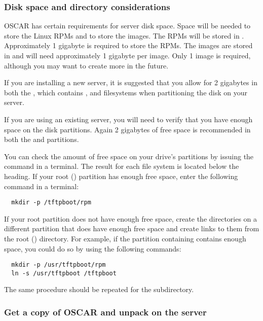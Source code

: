 \subsubsection{Disk space and directory considerations}
\label{det:serverdiskpar}

OSCAR has certain requirements for server disk space. Space will be
needed to store the Linux RPMs and to store the images.  The RPMs will
be stored in . Approximately 1 gigabyte is
required to store the RPMs.  The images are stored in
 and will need approximately 1 gigabyte
per image. Only 1 image is required, although you may want to create
more in the future.

If you are installing a new server, it is suggested that you allow for 
2 gigabytes in both the \file{/}, which contains ,  
and  filesystems when partitioning the disk on your server.

If you are using an existing server, you will need to verify that you have 
enough space on the disk partitions. Again 2 gigabytes of free space
is recommended in both the \file{/} and  partitions.

You can check
the amount of free space on your drive's partitions by issuing the
command  in a terminal.  The result for each file system is
located below the  heading. If your root (\file{/})
partition has enough free space, enter the following command in a
terminal:

\begin{verbatim}
  mkdir -p /tftpboot/rpm
\end{verbatim}
  
If your root partition does not have enough free space, create the
directories on a different partition that does have enough free space
and create links to them from the root (\file{/}) directory.  For
example, if the partition containing  contains enough
space, you could do so by using the following commands:

\begin{verbatim}
  mkdir -p /usr/tftpboot/rpm
  ln -s /usr/tftpboot /tftpboot
\end{verbatim}
The same procedure should be repeated for the 
subdirectory.

    
\subsubsection{Get a copy of OSCAR and unpack on the server} 
\label{det:unpack}

